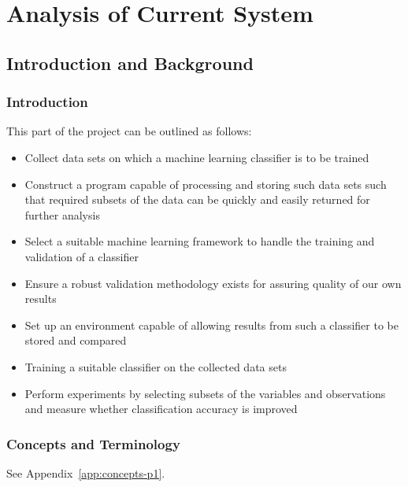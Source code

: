\part{Analysis of Current System}
\chapter{Introduction and Background}
\ifpdf
    \graphicspath{{Chapter2/Figs/Raster/}{Chapter2/Figs/PDF/}{Chapter2/Figs/}}
\else
    \graphicspath{{Chapter2/Figs/Vector/}{Chapter2/Figs/}}
\fi

\section{Introduction}

This part of the project can be outlined as follows:

\begin{itemize}
    \item Collect data sets on which a machine learning classifier is to be trained
    \item Construct a program capable of processing and storing such data sets
        such that required subsets of the data can be quickly and easily
        returned for further analysis
    \item Select a suitable machine learning framework to handle the training
        and validation of a classifier
    \item Ensure a robust validation methodology exists for assuring quality of
        our own results
    \item Set up an environment capable of allowing results from such a
        classifier to be stored and compared
    \item Training a suitable classifier on the collected data sets
    \item Perform experiments by selecting subsets of the variables and
        observations and measure whether classification accuracy is improved
\end{itemize}


\section{Concepts and Terminology}
See Appendix~\ref{app:concepts-p1}.

